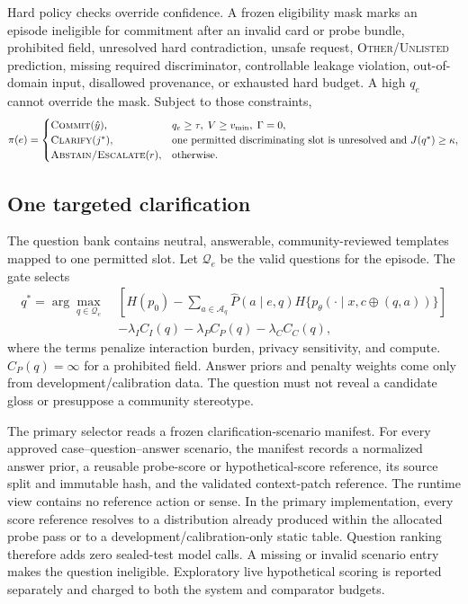 \documentclass[preprint,12pt,authoryear]{elsarticle}
\newcommand{\commit}{\ifmmode\operatorname{COMMIT}\else\textsc{Commit}\fi}
\newcommand{\clarify}{\ifmmode\operatorname{CLARIFY}\else\textsc{Clarify}\fi}
\newcommand{\abstain}{\ifmmode\operatorname{ABSTAIN}\else\textsc{Abstain/Escalate}\fi}
\begin{document}
Hard policy checks override confidence. A frozen eligibility mask marks an
episode ineligible for commitment after an invalid card or probe bundle,
prohibited field, unresolved hard contradiction, unsafe request,
\textsc{Other/Unlisted} prediction, missing required discriminator,
controllable leakage violation, out-of-domain input, disallowed provenance,
or exhausted hard budget. A high $q_e$ cannot override the mask. Subject to
those constraints,
\begin{equation}
\pi(e)=
\begin{cases}
\commit(\hat y), & q_e\ge\tau,\; V\ge v_{\min},\;\Gamma=0,\\
\clarify(j^*), & \text{one permitted discriminating slot is unresolved and }J(q^*)\ge\kappa,\\
\abstain(r), & \text{otherwise.}
\end{cases}
\end{equation}

\subsection{One targeted clarification}

The question bank contains neutral, answerable, community-reviewed templates
mapped to one permitted slot. Let $\mathcal{Q}_e$ be the valid questions for
the episode. The gate selects
\begin{align}
q^*=\arg\max_{q\in\mathcal{Q}_e}\;&
\left[H(p_0)-\sum_{a\in\mathcal{A}_q}
\widehat P(a\mid e,q)H\{p_\theta(\cdot\mid x,c\oplus(q,a))\}\right]
\nonumber\\
&-\lambda_I C_I(q)-\lambda_P C_P(q)-\lambda_C C_C(q),
\end{align}
where the terms penalize interaction burden, privacy sensitivity, and compute.
$C_P(q)=\infty$ for a prohibited field. Answer priors and penalty weights come
only from development/calibration data. The question must not reveal a
candidate gloss or presuppose a community stereotype.

The primary selector reads a frozen clarification-scenario manifest. For every
approved case--question--answer scenario, the manifest records a normalized
answer prior, a reusable probe-score or hypothetical-score reference, its
source split and immutable hash, and the validated context-patch reference.
The runtime view contains no reference action or sense. In the primary
implementation, every score reference resolves to a distribution already
produced within the allocated probe pass or to a development/calibration-only
static table. Question ranking therefore adds zero sealed-test model calls.
A missing or invalid scenario entry makes the question ineligible. Exploratory
live hypothetical scoring is reported separately and charged to both the
system and comparator budgets.
\end{document}
